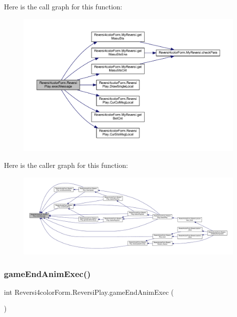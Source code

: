 Here is the call graph for this function\+:
\nopagebreak
\begin{figure}[H]
\begin{center}
\leavevmode
\includegraphics[width=350pt]{class_reversi4color_form_1_1_reversi_play_a3e9c0923815d7270ae73c88ff57244d4_cgraph}
\end{center}
\end{figure}
Here is the caller graph for this function\+:
\nopagebreak
\begin{figure}[H]
\begin{center}
\leavevmode
\includegraphics[width=350pt]{class_reversi4color_form_1_1_reversi_play_a3e9c0923815d7270ae73c88ff57244d4_icgraph}
\end{center}
\end{figure}
\mbox{\label{class_reversi4color_form_1_1_reversi_play_a1f415a175312ca4d39d36685d3404311}} 
\subsubsection{\texorpdfstring{game\+End\+Anim\+Exec()}{gameEndAnimExec()}}
{\footnotesize\ttfamily int Reversi4color\+Form.\+Reversi\+Play.\+game\+End\+Anim\+Exec (\begin{DoxyParamCaption}{ }\end{DoxyParamCaption})}



